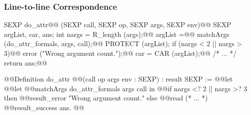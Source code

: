 \documentclass{beamer}
\begin{document}
\begin{frame}[fragile]
    \frametitle{Line-to-line Correspondence}

    \begin{widemargin}\centering{}
\begin{minipage}{.53\textwidth}
\begin{ccode}[fontsize=\tiny]
SEXP do_attr@@
    (SEXP call, SEXP op, SEXP args, SEXP env){@@
  SEXP argList, car, ans;
  int nargs = R_length (args);@@
  argList =@@
    matchArgs (do_attr_formals, args, call);@@
  PROTECT (argList);
  if (nargs < 2 || nargs > 3)@@
    error ("Wrong argument count.");@@
  car = CAR (argList);@@
  /* ... */
  return ans;@@
}
\end{ccode}
\end{minipage}
\qquad
\begin{minipage}{.5\textwidth}
\begin{coqcode}[fontsize=\tiny]
@@Definition do_attr
    @@(call op args env : SEXP)
    : result SEXP :=
  @@let%
  @@let%
    @@matchArgs do_attr_formals args call in
  @@if nargs <? 2 || nargs >? 3 then
    @@result_error "Wrong argument count."
  else
    @@read%
    (* ... *)
    @@result_success ans.
@@
\end{coqcode}
\end{minipage}
    \end{widemargin}


\end{frame}
\end{document}
